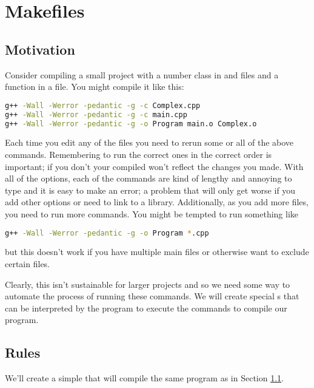 \chapter{Makefiles}\label{ch:Makefile}

\section{Motivation}\label{sec:makefile-motivation}

Consider compiling a small project with a  number class in  and  files and a  function in a  file.
You might compile it like this:

\begin{lstlisting}[language=bash]
g++ -Wall -Werror -pedantic -g -c Complex.cpp
g++ -Wall -Werror -pedantic -g -c main.cpp
g++ -Wall -Werror -pedantic -g -o Program main.o Complex.o
\end{lstlisting}

Each time you edit any of the files you need to rerun some or all of the above commands.
Remembering to run the correct ones in the correct order is important; if you don't your compiled  won't reflect the changes you made.
With all of the options, each of the commands are kind of lengthy and annoying to type and it is easy to make an error; a problem that will only get worse if you add other options or need to link to a library.
Additionally, as you add more files, you need to run more commands.
You might be tempted to run something like
\begin{lstlisting}[language=bash]
g++ -Wall -Werror -pedantic -g -o Program *.cpp
\end{lstlisting}
but this doesn't work if you have multiple main files or otherwise want to exclude certain files.

Clearly, this isn't sustainable for larger projects and so we need some way to automate the process of running these commands.
We will create special s that can be interpreted by the program  to execute the commands to compile our program.

\section{Rules}\label{sec:makefile-rules}

We'll create a simple  that will compile the same program as in Section \ref{sec:makefile-motivation}.

